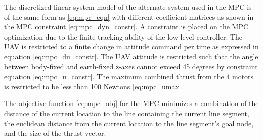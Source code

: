 The discretized linear system model of the alternate system used in the MPC is of the same form as \eqref{eq:mpc_eqn} with different coefficient matrices as shown in the MPC constraint \eqref{eq:mpc_dyn_constr}.  A constraint is placed on the MPC optimization due to the finite tracking ability of the low-level controller. The UAV is restricted to a finite change in attitude command per time as expressed in equation \eqref{eq:mpc_du_constr}.  The UAV attitude is restricted such that the angle between body-fixed and earth-fixed z-axes cannot exceed 45 degrees by constraint equation \eqref{eq:mpc_u_constr}.  The maximum combined thrust from the 4 motors is restricted to be less than 100 Newtons \eqref{eq:mpc_umax}.

The objective function \eqref{eq:mpc_obj} for the MPC minimizes a combination of the distance of the current location to the line containing the current line segment, the euclidean distance from the current location to the line segment's goal node, and the size of the thrust-vector.


